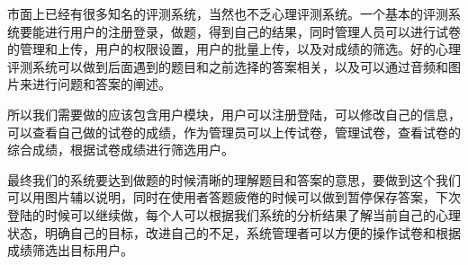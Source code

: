 市面上已经有很多知名的评测系统，当然也不乏心理评测系统。一个基本的评测系统要能进行用户的注册登录，做题，得到自己的结果，同时管理人员可以进行试卷的管理和上传，用户的权限设置，用户的批量上传，以及对成绩的筛选。好的心理评测系统可以做到后面遇到的题目和之前选择的答案相关，以及可以通过音频和图片来进行问题和答案的阐述。

所以我们需要做的应该包含用户模块，用户可以注册登陆，可以修改自己的信息，可以查看自己做的试卷的成绩，作为管理员可以上传试卷，管理试卷，查看试卷的综合成绩，根据试卷成绩进行筛选用户。

最终我们的系统要达到做题的时候清晰的理解题目和答案的意思，要做到这个我们可以用图片辅以说明，同时在使用者答题疲倦的时候可以做到暂停保存答案，下次登陆的时候可以继续做，每个人可以根据我们系统的分析结果了解当前自己的心理状态，明确自己的目标，改进自己的不足，系统管理者可以方便的操作试卷和根据成绩筛选出目标用户。























